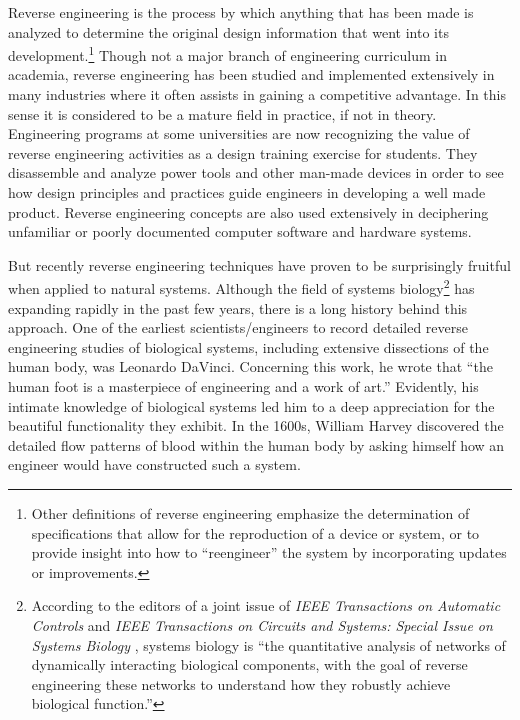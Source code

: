 Reverse engineering is the process by which anything that has been made
is analyzed to determine the original design information that went into
its development.\footnote{
Other definitions of reverse engineering emphasize
the determination of specifications that allow for the reproduction of
a device or system, or to provide insight into how to “reengineer” the
system by incorporating updates or improvements.
} Though not a major branch of
engineering curriculum in academia, reverse engineering has been
studied and implemented extensively in many industries where it often
assists in gaining a competitive advantage. In this sense it is
considered to be a mature field in practice, if not in theory.
Engineering programs at some universities are now recognizing the value
of reverse engineering activities as a design training exercise for
students.\citep[][pgs. 57--59]{wu2008}
They disassemble and analyze power tools
and other man-made devices in order to see how design principles and
practices guide engineers in developing a well made product. Reverse
engineering concepts are also used extensively in deciphering
unfamiliar or poorly documented computer software and hardware
systems.\citep{eilam2005}

But recently reverse engineering techniques have proven to be
surprisingly fruitful when applied to natural systems. Although the
field of systems biology\footnote{
According to the editors of a joint issue of
\textit{IEEE Transactions on Automatic Controls} and \textit{IEEE
Transactions on Circuits and Systems: Special Issue on Systems Biology
}, systems biology is “the quantitative analysis of
networks of dynamically interacting biological components, with the
goal of reverse engineering these networks to understand how they
robustly achieve biological function.”\citep[][pg. 4]{joint2008}
} has expanding rapidly in
the past few years, there is a long history behind this approach. One
of the earliest scientists/engineers to record detailed reverse
engineering studies of biological systems, including extensive
dissections of the human body, was Leonardo DaVinci. Concerning this
work, he wrote that “the human foot is a masterpiece of engineering and
a work of art.” Evidently, his intimate knowledge of biological systems
led him to a deep appreciation for the beautiful functionality they
exhibit. In the 1600s, William Harvey discovered the detailed flow
patterns of blood within the human body by asking himself how an
engineer would have constructed such a system.\citep{auffraynoble2009}


